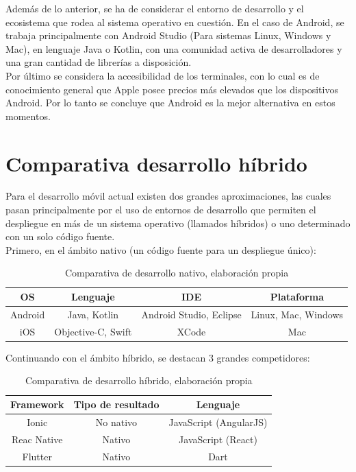 Además de lo anterior, se ha de considerar el entorno de desarrollo y el ecosistema que rodea al sistema operativo en cuestión. En el caso de Android, se trabaja principalmente con Android Studio (Para sistemas Linux, Windows y Mac), en lenguaje Java o Kotlin, con una comunidad activa de desarrolladores y una gran cantidad de librerías a disposición.\\
Por último se considera la accesibilidad de los terminales, con lo cual es de conocimiento general que Apple posee precios más elevados que los dispositivos Android.
Por lo tanto se concluye que Android es la mejor alternativa en estos momentos.

\newpage
\section{Comparativa desarrollo híbrido}
Para el desarrollo móvil actual existen dos grandes aproximaciones, las cuales pasan principalmente por el uso de entornos de desarrollo que permiten el despliegue en más de un sistema operativo (llamados híbridos) o uno determinado con un solo código fuente.\\

Primero, en el ámbito nativo (un código fuente para un despliegue único): 

\begin{table}[H]
	\centering
	\begin{tabular}{| c | c | c | c |}
		\hline
		\multicolumn{1}{|c|}{\textbf{OS}}&
		\multicolumn{1}{c|}{\textbf{Lenguaje}}&
		\multicolumn{1}{|c|}{\textbf{IDE}}&
		\multicolumn{1}{|c|}{\textbf{Plataforma}}\\ \hline
		Android  & Java, Kotlin  & Android Studio, Eclipse & Linux, Mac, Windows \\ \hline
		iOS  & Objective-C, Swift & XCode & Mac \\ \hline
	\end{tabular}
	\caption{Comparativa de desarrollo nativo, elaboración propia}
	\label{native_comparative}
\end{table}

Continuando con el ámbito híbrido, se destacan 3 grandes competidores:

\begin{table}[H]
	\centering
	\begin{tabular}{| c | c | c |}
		\hline
		\multicolumn{1}{|c|}{\textbf{Framework}}&
		\multicolumn{1}{c|}{\textbf{Tipo de resultado}}&
		\multicolumn{1}{|c|}{\textbf{Lenguaje}}\\ \hline
		Ionic  & No nativo  & JavaScript (AngularJS) \\ \hline
		Reac Native  & Nativo & JavaScript (React) \\ \hline
		Flutter  & Nativo & Dart \\ \hline
	\end{tabular}
	\caption{Comparativa de desarrollo híbrido, elaboración propia}
	\label{hybrid_comparative}
\end{table}

